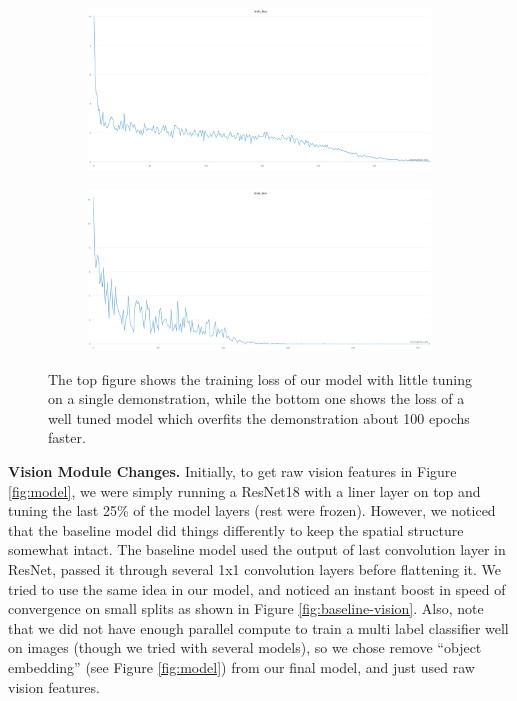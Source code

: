 \documentclass[11pt,a4paper]{article}
\begin{document}
\begin{figure}
    \centering
    \begin{subfigure}[b]{0.5\textwidth}
    \centering
    \includegraphics[scale=0.2]{figures/initial_loss_one_task.png}
    \caption{}
    \end{subfigure}
    \hfill
    \begin{subfigure}[b]{0.5\textwidth}
    \centering
    \includegraphics[scale=0.2]{figures/hp_tuned_loss_one_task.png}
    \caption{}
    \end{subfigure}
    \caption{The top figure shows the training loss of our model with little tuning on a single demonstration, while the bottom one shows the loss of a well tuned model which overfits the demonstration about 100 epochs faster.}
    \label{fig:hp-tuning-comp}
\end{figure}

\textbf{Vision Module Changes.} Initially, to get raw vision features in Figure \ref{fig:model}, we were simply running a ResNet18 with a liner layer on top and tuning the last 25\% of the model layers (rest were frozen). However, we noticed that the baseline model did things differently to keep the spatial structure somewhat intact. The baseline model used the output of last convolution layer in ResNet, passed it through several 1x1 convolution layers before flattening it. We tried to use the same idea in our model, and noticed an instant boost in speed of convergence on small splits as shown in Figure \ref{fig:baseline-vision}. Also, note that we did not have enough parallel compute to train a multi label classifier well on images (though we tried with several models), so we chose remove ``object embedding'' (see Figure \ref{fig:model}) from our final model, and just used raw vision features.
\end{document}
